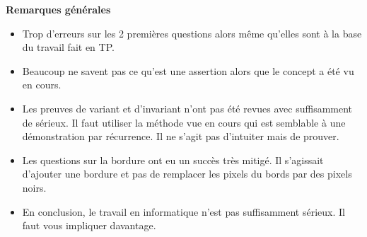 \documentclass[10pt,fleqn]{article} %
\begin{document}

\pagestyle{fancy}
\thispagestyle{plain}


\def\columnseprulecolor{\color{ocre}}
\setlength{\columnseprule}{0.4pt} 



\vspace{6cm}
%

\textbf{Remarques générales}
\begin{itemize}
\item Trop d'erreurs sur les 2 premières questions alors même qu'elles sont à la base du travail fait en TP.
\item Beaucoup ne savent pas ce qu'est une assertion alors que le concept a été vu en cours. 
\item Les preuves de variant et d'invariant n'ont pas été revues avec suffisamment de sérieux. Il faut utiliser la méthode vue en cours qui est semblable à une démonstration par récurrence. Il ne s'agit pas d'intuiter mais de prouver.
\item Les questions sur la bordure ont eu un succès très mitigé. Il s'agissait d'ajouter une bordure et pas de remplacer les pixels du bords par des pixels noirs. 
\item En conclusion, le travail en informatique n'est pas suffisamment sérieux. Il faut vous impliquer davantage.
\end{itemize}




%
\end{document}
